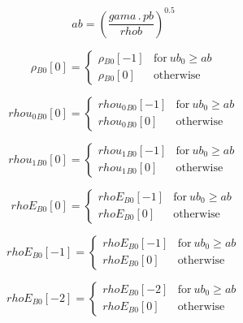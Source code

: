 \documentclass{article}
\begin{document}
\begin{dmath}ab = \left(\frac{gama \,.\, pb}{rhob} \right)^{0.5}\end{dmath}

\begin{dmath}{\rho{_{B0}}}[{0}] = \begin{cases} {\rho{_{B0}}}[{-1}] & \text{for}\: ub_{0} \geq ab \\{\rho{_{B0}}}[{0}] & \text{otherwise} \end{cases}\end{dmath}

\begin{dmath}{rhou_{0}{_{B0}}}[{0}] = \begin{cases} {rhou_{0}{_{B0}}}[{-1}] & \text{for}\: ub_{0} \geq ab \\{rhou_{0}{_{B0}}}[{0}] & \text{otherwise} \end{cases}\end{dmath}

\begin{dmath}{rhou_{1}{_{B0}}}[{0}] = \begin{cases} {rhou_{1}{_{B0}}}[{-1}] & \text{for}\: ub_{0} \geq ab \\{rhou_{1}{_{B0}}}[{0}] & \text{otherwise} \end{cases}\end{dmath}

\begin{dmath}{rhoE{_{B0}}}[{0}] = \begin{cases} {rhoE{_{B0}}}[{-1}] & \text{for}\: ub_{0} \geq ab \\{rhoE{_{B0}}}[{0}] & \text{otherwise} \end{cases}\end{dmath}

\begin{dmath}{rhoE{_{B0}}}[{-1}] = \begin{cases} {rhoE{_{B0}}}[{-1}] & \text{for}\: ub_{0} \geq ab \\{rhoE{_{B0}}}[{0}] & \text{otherwise} \end{cases}\end{dmath}

\begin{dmath}{rhoE{_{B0}}}[{-2}] = \begin{cases} {rhoE{_{B0}}}[{-2}] & \text{for}\: ub_{0} \geq ab \\{rhoE{_{B0}}}[{0}] & \text{otherwise} \end{cases}\end{dmath}
\end{document}
